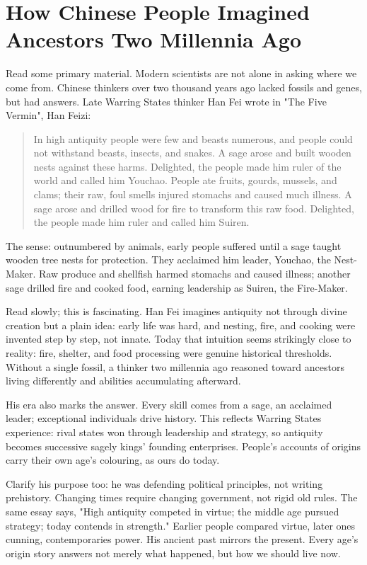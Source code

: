 \section[Ancestors in Ancient Chinese Thought]{How Chinese People Imagined Ancestors Two Millennia Ago}
Read some primary material. Modern scientists are not alone in asking where we come from. Chinese thinkers over two thousand years ago lacked fossils and genes, but had answers. Late Warring States thinker Han Fei wrote in "The Five Vermin", Han Feizi:

\begin{quote}
In high antiquity people were few and beasts numerous, and people could not withstand beasts, insects, and snakes. A sage arose and built wooden nests against these harms. Delighted, the people made him ruler of the world and called him Youchao. People ate fruits, gourds, mussels, and clams; their raw, foul smells injured stomachs and caused much illness. A sage arose and drilled wood for fire to transform this raw food. Delighted, the people made him ruler and called him Suiren.
\end{quote}
The sense: outnumbered by animals, early people suffered until a sage taught wooden tree nests for protection. They acclaimed him leader, Youchao, the Nest-Maker. Raw produce and shellfish harmed stomachs and caused illness; another sage drilled fire and cooked food, earning leadership as Suiren, the Fire-Maker.

Read slowly; this is fascinating. Han Fei imagines antiquity not through divine creation but a plain idea: early life was hard, and nesting, fire, and cooking were invented step by step, not innate. Today that intuition seems strikingly close to reality: fire, shelter, and food processing were genuine historical thresholds. Without a single fossil, a thinker two millennia ago reasoned toward ancestors living differently and abilities accumulating afterward.

His era also marks the answer. Every skill comes from a sage, an acclaimed leader; exceptional individuals drive history. This reflects Warring States experience: rival states won through leadership and strategy, so antiquity becomes successive sagely kings' founding enterprises. People's accounts of origins carry their own age's colouring, as ours do today.

Clarify his purpose too: he was defending political principles, not writing prehistory. Changing times require changing government, not rigid old rules. The same essay says, "High antiquity competed in virtue; the middle age pursued strategy; today contends in strength." Earlier people compared virtue, later ones cunning, contemporaries power. His ancient past mirrors the present. Every age's origin story answers not merely what happened, but how we should live now.

